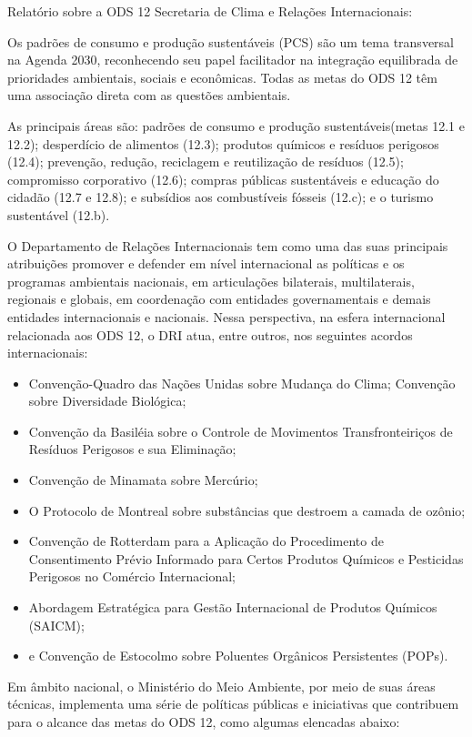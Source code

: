 \documentclass{beamer}
\begin{document}
\begin{frame}[allowframebreaks]{Relatório sobre a ODS 12}
		Secretaria de Clima e Relações Internacionais:
		
		Os padrões de consumo e produção sustentáveis ​(PCS) são um tema transversal na Agenda 2030, reconhecendo seu papel facilitador na integração equilibrada de prioridades ambientais, sociais e econômicas. Todas as metas do ODS 12 têm uma associação direta  com as questões ambientais.
		
		As principais áreas são: padrões de consumo e produção sustentáveis ​(metas 12.1 e 12.2); desperdício de alimentos (12.3); produtos químicos e resíduos perigosos (12.4); prevenção, redução, reciclagem e reutilização de resíduos (12.5); compromisso corporativo (12.6); compras públicas sustentáveis ​e educação do cidadão (12.7 e 12.8); e subsídios aos combustíveis fósseis (12.c); e o turismo sustentável (12.b).
		
		O Departamento de Relações Internacionais tem como uma das suas principais atribuições promover e defender em nível internacional as políticas e os programas ambientais nacionais, em articulações bilaterais, multilaterais, regionais e globais, em coordenação com entidades governamentais e demais entidades internacionais e nacionais. Nessa perspectiva, na esfera internacional relacionada aos ODS 12, o DRI atua, entre outros, nos seguintes acordos internacionais:
		
		\begin{itemize}
			\item Convenção-Quadro das Nações Unidas sobre Mudança do Clima; Convenção sobre Diversidade Biológica;
			\item Convenção da Basiléia sobre o Controle de Movimentos Transfronteiriços de Resíduos Perigosos e sua Eliminação;
			\item Convenção de Minamata sobre Mercúrio;
			\item O Protocolo de Montreal sobre substâncias que destroem a camada de ozônio;
			\item Convenção de Rotterdam para a Aplicação do Procedimento de Consentimento Prévio Informado para Certos Produtos Químicos e Pesticidas Perigosos no Comércio Internacional;
			\item Abordagem Estratégica para Gestão Internacional de Produtos Químicos (SAICM);
			\item e Convenção de Estocolmo sobre Poluentes Orgânicos Persistentes (POPs).	
		\end{itemize}
		
		Em âmbito nacional, o Ministério do Meio Ambiente, por meio de suas áreas técnicas, implementa uma série de políticas públicas e iniciativas que contribuem para o alcance das metas do ODS 12, como algumas elencadas abaixo:
		

\end{frame}
\end{document}
